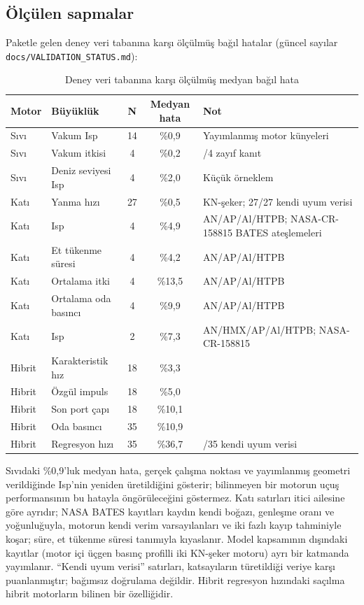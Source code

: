 \documentclass[11pt,a4paper]{article}
\newcommand{\kod}[1]{\texttt{#1}}
\begin{document}
\subsection{Ölçülen sapmalar}

Paketle gelen deney veri tabanına karşı ölçülmüş bağıl hatalar (güncel
sayılar \kod{docs/\allowbreak{}VALIDATION\_\allowbreak{}STATUS.md}):

\begin{table}[htbp]
\centering\small
\caption{Deney veri tabanına karşı ölçülmüş medyan bağıl hata}\label{tab:sapma}
\begin{tabular}{@{}>{\raggedright\arraybackslash}p{2.2cm}>{\raggedright\arraybackslash}p{4.4cm}cc>{\raggedright\arraybackslash}p{5.4cm}@{}}
\toprule
\textbf{Motor} & \textbf{Büyüklük} & \textbf{N} & \textbf{Medyan hata} & \textbf{Not} \\
\midrule
Sıvı & Vakum Isp & 14 & \%0,9 & Yayımlanmış motor künyeleri \\
Sıvı & Vakum itkisi & 4 & \%0,2 & 4/4 zayıf kanıt \\
Sıvı & Deniz seviyesi Isp & 4 & \%2,0 & Küçük örneklem \\
Katı & Yanma hızı & 27 & \%0,5 & KN-şeker; 27/27 kendi uyum verisi \\
Katı & Isp & 4 & \%4,9 & AN/AP/Al/HTPB; NASA-CR-158815 BATES ateşlemeleri \\
Katı & Et tükenme süresi & 4 & \%4,2 & AN/AP/Al/HTPB \\
Katı & Ortalama itki & 4 & \%13,5 & AN/AP/Al/HTPB \\
Katı & Ortalama oda basıncı & 4 & \%9,9 & AN/AP/Al/HTPB \\
Katı & Isp & 2 & \%7,3 & AN/HMX/AP/Al/HTPB; NASA-CR-158815 \\
Hibrit & Karakteristik hız & 18 & \%3,3 & \\
Hibrit & Özgül impuls & 18 & \%5,0 & \\
Hibrit & Son port çapı & 18 & \%10,1 & \\
Hibrit & Oda basıncı & 35 & \%10,9 & \\
Hibrit & Regresyon hızı & 35 & \%36,7 & 17/35 kendi uyum verisi \\
\bottomrule
\end{tabular}
\end{table}

Sıvıdaki \%0,9'luk medyan hata, gerçek çalışma noktası ve yayımlanmış geometri
verildiğinde Isp'nin yeniden üretildiğini gösterir; bilinmeyen bir motorun
uçuş performansının bu hatayla öngörüleceğini göstermez. Katı satırları itici
ailesine göre ayrıdır; NASA BATES kayıtları kaydın kendi boğazı, genleşme oranı
ve yoğunluğuyla, motorun kendi verim varsayılanları ve iki fazlı kayıp
tahminiyle koşar; süre, et tükenme süresi tanımıyla kıyaslanır. Model
kapsamının dışındaki kayıtlar (motor içi üçgen basınç profilli iki KN-şeker
motoru) ayrı bir katmanda yayımlanır. ``Kendi uyum
verisi'' satırları, katsayıların türetildiği veriye karşı puanlanmıştır;
bağımsız doğrulama değildir. Hibrit regresyon hızındaki saçılma hibrit
motorların bilinen bir özelliğidir.
\end{document}
